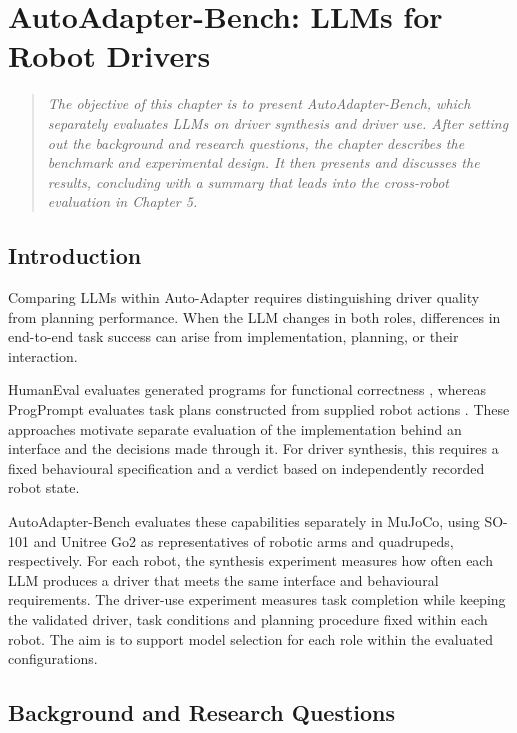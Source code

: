 \chapter[AutoAdapter-Bench]{AutoAdapter-Bench: LLMs for Robot Drivers}
\label{chapter:autoadapter-bench}

\begin{quote}\itshape
The objective of this chapter is to present AutoAdapter-Bench, which separately
evaluates LLMs on driver synthesis and driver use. After setting out the
background and research questions, the chapter describes the benchmark and
experimental design. It then presents and discusses the results, concluding
with a summary that leads into the cross-robot evaluation in Chapter 5.
\end{quote}

\section[Introduction]{Introduction}

Comparing LLMs within Auto-Adapter requires distinguishing driver quality from
planning performance. When the LLM changes in both roles, differences in
end-to-end task success can arise from implementation, planning, or their
interaction.

HumanEval evaluates generated programs for functional correctness
\citep{chen2021codex}, whereas ProgPrompt evaluates task plans constructed from
supplied robot actions \citep{singh2023progprompt}. These approaches motivate
separate evaluation of the implementation behind an interface and the decisions
made through it. For driver synthesis, this requires a fixed behavioural
specification and a verdict based on independently recorded robot state.

AutoAdapter-Bench evaluates these capabilities separately in MuJoCo, using
SO-101 and Unitree Go2 as representatives of robotic arms and quadrupeds,
respectively. For each robot, the synthesis experiment measures how often each
LLM produces a driver that meets the same interface and behavioural
requirements. The driver-use experiment measures task completion while keeping
the validated driver, task conditions and planning procedure fixed within each
robot. The aim is to support model selection for each role within the evaluated
configurations.



\section[Background and Research Questions]{Background and Research Questions}

